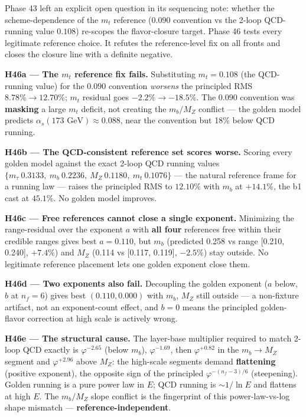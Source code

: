 \documentclass[
]{article}
\begin{document}
Phase 43 left an explicit open question in its sequencing note: whether
the scheme-dependence of the \(m_t\) reference (\(0.090\) convention vs
the 2-loop QCD-running value \(0.108\)) re-scopes the flavor-closure
target. Phase 46 tests every legitimate reference choice. It refutes the
reference-level fix on all fronts and closes the closure line with a
definite negative.

\textbf{H46a --- The \(m_t\) reference fix fails.} Substituting
\(m_t = 0.108\) (the QCD-running value) for the \(0.090\) convention
\emph{worsens} the principled RMS \(8.78\% \to 12.70\%\); \(m_t\)
residual goes \(-2.2\% \to -18.5\%\). The \(0.090\) convention was
\textbf{masking} a large \(m_t\) deficit, not creating the \(m_b/M_Z\)
conflict --- the golden model predicts
\(\alpha_s(173 \text{ GeV})\approx 0.088\), near the convention but 18\%
below QCD running.

\textbf{H46b --- The QCD-consistent reference set scores worse.} Scoring
every golden model against the exact 2-loop QCD running values
\(\{m_\tau\ 0.3133,\ m_b\ 0.2236,\ M_Z\ 0.1180,\ m_t\ 0.1076\}\) --- the
natural reference frame for a running law --- raises the principled RMS
to \(12.10\%\) with \(m_b\) at \(+14.1\%\), the b1 cast at \(45.1\%\).
No golden model improves.

\textbf{H46c --- Free references cannot close a single exponent.}
Minimizing the range-residual over the exponent \(a\) with \textbf{all
four} references free within their credible ranges gives best
\(a = 0.110\), but \(m_b\) (predicted 0.258 vs range {[}0.210, 0.240{]},
\(+7.4\%\)) and \(M_Z\) (0.114 vs {[}0.117, 0.119{]}, \(-2.5\%\)) stay
outside. No legitimate reference placement lets one golden exponent
close them.

\textbf{H46d --- Two exponents also fail.} Decoupling the golden
exponent (\(a\) below, \(b\) at \(n_f=6\)) gives best \((0.110, 0.000)\)
with \(m_b\), \(M_Z\) still outside --- a non-fixture artifact, not an
exponent-count effect, and \(b=0\) means the principled golden-flavor
correction at high scale is actively wrong.

\textbf{H46e --- The structural cause.} The layer-base multiplier
required to match 2-loop QCD exactly is \(\varphi^{-2.65}\) (below
\(m_b\)), \(\varphi^{-1.69}\), then \(\varphi^{+0.82}\) in the
\(m_b \to M_Z\) segment and \(\varphi^{+2.96}\) above \(M_Z\): the
high-scale segments demand \textbf{flattening} (positive exponent), the
opposite sign of the principled \(\varphi^{-(n_f-3)/6}\) (steepening).
Golden running is a pure power law in \(E\); QCD running is
\(\sim 1/\ln E\) and flattens at high \(E\). The \(m_b/M_Z\) slope
conflict is the fingerprint of this power-law-vs-log shape mismatch ---
\textbf{reference-independent}.
\end{document}
